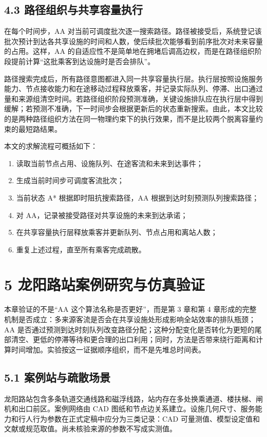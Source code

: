 \documentclass[UTF8,a4paper,12pt]{ctexart}
\begin{document}
\subsection{4.3 路径组织与共享容量执行}

在每个时间步，AA 对当前可调度批次逐一搜索路径。路径被接受后，系统登记该批次预计到达各共享设施的时间和人数，使后续批次能够看到前序批次对未来容量的占用。这样，AA 的自适应性不是简单地在拥堵后调高边权，而是在路径组织阶段提前计算“这批乘客到达设施时是否会排队”。

路径搜索完成后，所有路径意图都进入同一共享容量执行层。执行层按照设施服务能力、节点接收能力和在途移动过程释放乘客，并记录实际队列、停滞、出口通过量和来源组清空时间。若路径组织阶段预测准确，关键设施排队应在执行层中得到缓解；若预测不准确，下一时间步会根据更新后的状态重新搜索。由此，本文比较的是两种路径组织方法在同一物理约束下的执行效果，而不是比较两个脱离容量约束的最短路结果。

本文的求解流程可概括如下：
\begin{enumerate}
\item 读取当前节点占用、设施队列、在途客流和未来到达事件；
\item 生成当前时间步可调度客流批次；
\item 当前状态 A* 根据即时阻抗搜索路径，AA 根据到达时刻预测队列搜索路径；
\item 对 AA，记录被接受路径对共享设施的未来到达承诺；
\item 在共享容量执行层释放乘客并更新队列、节点占用和离站人数；
\item 重复上述过程，直至所有乘客完成疏散。
\end{enumerate}

\section{5 龙阳路站案例研究与仿真验证}

本章验证的不是“AA 这个算法名称是否更好”，而是第 3 章和第 4 章形成的完整机制是否成立：多来源客流是否会在共享设施处形成影响全站效率的排队瓶颈；AA 是否通过预测到达时刻队列改变路径分配；这种分配变化是否转化为更短的尾部清空、更低的停滞等待和更合理的出口利用；同时，方法是否带来绕行距离和计算时间增加。实验按这一证据顺序组织，而不是先堆总时间表。

\subsection{5.1 案例站与疏散场景}

龙阳路站包含多条轨道交通线路和磁浮线路，站内存在多处换乘通道、楼扶梯、闸机和出口前区。案例网络由 CAD 图纸和节点边关系建立。设施几何尺寸、服务能力和行人行为参数在正式定稿中应分为三类记录：CAD 可量测值、模型设定值和文献或规范取值。尚未核验来源的参数不写成实测值。
\end{document}
